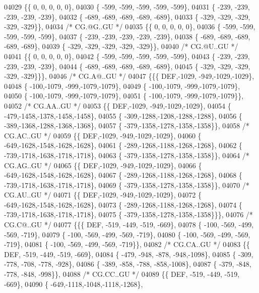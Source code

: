 \begin{DoxyCode}
04029 \{\{    0,    0,    0,    0,    0\},
04030 \{ -599, -599, -599, -599, -599\},
04031 \{ -239, -239, -239, -239, -239\},
04032 \{ -689, -689, -689, -689, -689\},
04033 \{ -329, -329, -329, -329, -329\}\},
04034 \textcolor{comment}{/* CG.@G..GU */}
04035 \{\{    0,    0,    0,    0,    0\},
04036 \{ -599, -599, -599, -599, -599\},
04037 \{ -239, -239, -239, -239, -239\},
04038 \{ -689, -689, -689, -689, -689\},
04039 \{ -329, -329, -329, -329, -329\}\},
04040 \textcolor{comment}{/* CG.@U..GU */}
04041 \{\{    0,    0,    0,    0,    0\},
04042 \{ -599, -599, -599, -599, -599\},
04043 \{ -239, -239, -239, -239, -239\},
04044 \{ -689, -689, -689, -689, -689\},
04045 \{ -329, -329, -329, -329, -329\}\}\},
04046 \textcolor{comment}{/* CG.A@..GU */}
04047 \{\{\{  DEF,-1029, -949,-1029,-1029\},
04048 \{ -100,-1079, -999,-1079,-1079\},
04049 \{ -100,-1079, -999,-1079,-1079\},
04050 \{ -100,-1079, -999,-1079,-1079\},
04051 \{ -100,-1079, -999,-1079,-1079\}\},
04052 \textcolor{comment}{/* CG.AA..GU */}
04053 \{\{  DEF,-1029, -949,-1029,-1029\},
04054 \{ -479,-1458,-1378,-1458,-1458\},
04055 \{ -309,-1288,-1208,-1288,-1288\},
04056 \{ -389,-1368,-1288,-1368,-1368\},
04057 \{ -379,-1358,-1278,-1358,-1358\}\},
04058 \textcolor{comment}{/* CG.AC..GU */}
04059 \{\{  DEF,-1029, -949,-1029,-1029\},
04060 \{ -649,-1628,-1548,-1628,-1628\},
04061 \{ -289,-1268,-1188,-1268,-1268\},
04062 \{ -739,-1718,-1638,-1718,-1718\},
04063 \{ -379,-1358,-1278,-1358,-1358\}\},
04064 \textcolor{comment}{/* CG.AG..GU */}
04065 \{\{  DEF,-1029, -949,-1029,-1029\},
04066 \{ -649,-1628,-1548,-1628,-1628\},
04067 \{ -289,-1268,-1188,-1268,-1268\},
04068 \{ -739,-1718,-1638,-1718,-1718\},
04069 \{ -379,-1358,-1278,-1358,-1358\}\},
04070 \textcolor{comment}{/* CG.AU..GU */}
04071 \{\{  DEF,-1029, -949,-1029,-1029\},
04072 \{ -649,-1628,-1548,-1628,-1628\},
04073 \{ -289,-1268,-1188,-1268,-1268\},
04074 \{ -739,-1718,-1638,-1718,-1718\},
04075 \{ -379,-1358,-1278,-1358,-1358\}\}\},
04076 \textcolor{comment}{/* CG.C@..GU */}
04077 \{\{\{  DEF, -519, -449, -519, -669\},
04078 \{ -100, -569, -499, -569, -719\},
04079 \{ -100, -569, -499, -569, -719\},
04080 \{ -100, -569, -499, -569, -719\},
04081 \{ -100, -569, -499, -569, -719\}\},
04082 \textcolor{comment}{/* CG.CA..GU */}
04083 \{\{  DEF, -519, -449, -519, -669\},
04084 \{ -479, -948, -878, -948,-1098\},
04085 \{ -309, -778, -708, -778, -928\},
04086 \{ -389, -858, -788, -858,-1008\},
04087 \{ -379, -848, -778, -848, -998\}\},
04088 \textcolor{comment}{/* CG.CC..GU */}
04089 \{\{  DEF, -519, -449, -519, -669\},
04090 \{ -649,-1118,-1048,-1118,-1268\},

\end{DoxyCode}
